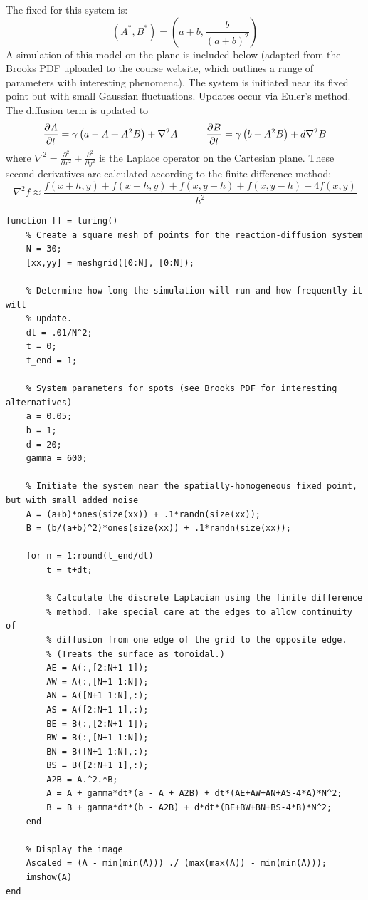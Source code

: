 \documentclass{article}
\begin{document}
The fixed for this system is:
\[ (A^*, B^*) = \left( a + b, \frac{b}{(a+b)^2} \right) \]
A simulation of this model on the plane is included below (adapted from the Brooks PDF uploaded to the course website, which outlines a range of parameters with interesting phenomena).  The system is initiated near its fixed point but with small Gaussian fluctuations. Updates occur via Euler's method. The diffusion term is updated to
\[ \frac{\partial A}{\partial t} = \gamma \left( a  - A + A^2 B \right) + \nabla^2 A \hspace{1 cm} \frac{\partial B}{\partial t} = \gamma \left( b -  A^2 B \right) + d \nabla^2 B\]
where $\nabla^2 = \frac{\partial^2}{\partial x^2} + \frac{\partial^2}{\partial y^2}$ is the Laplace operator on the Cartesian plane. These second derivatives are calculated according to the finite difference method:
\[ \nabla^2 f \approx \frac{f(x+h, y) + f(x-h,y) + f(x,y+h) + f(x,y-h) - 4 f(x,y)}{h^2} \]

\begin{lstlisting}
function [] = turing()
    % Create a square mesh of points for the reaction-diffusion system
    N = 30;
    [xx,yy] = meshgrid([0:N], [0:N]);
    
    % Determine how long the simulation will run and how frequently it will
    % update.
    dt = .01/N^2;
    t = 0;
    t_end = 1;
    
    % System parameters for spots (see Brooks PDF for interesting alternatives)
    a = 0.05;
    b = 1;
    d = 20;
    gamma = 600;
    
    % Initiate the system near the spatially-homogeneous fixed point, but with small added noise
    A = (a+b)*ones(size(xx)) + .1*randn(size(xx)); 
    B = (b/(a+b)^2)*ones(size(xx)) + .1*randn(size(xx));
    
    for n = 1:round(t_end/dt)
        t = t+dt;
        
        % Calculate the discrete Laplacian using the finite difference
        % method. Take special care at the edges to allow continuity of
        % diffusion from one edge of the grid to the opposite edge.
        % (Treats the surface as toroidal.)
        AE = A(:,[2:N+1 1]);
        AW = A(:,[N+1 1:N]);
        AN = A([N+1 1:N],:);
        AS = A([2:N+1 1],:);
        BE = B(:,[2:N+1 1]);
        BW = B(:,[N+1 1:N]);
        BN = B([N+1 1:N],:);
        BS = B([2:N+1 1],:);
        A2B = A.^2.*B;
        A = A + gamma*dt*(a - A + A2B) + dt*(AE+AW+AN+AS-4*A)*N^2;
        B = B + gamma*dt*(b - A2B) + d*dt*(BE+BW+BN+BS-4*B)*N^2;
    end
    
    % Display the image
    Ascaled = (A - min(min(A))) ./ (max(max(A)) - min(min(A)));
    imshow(A)
end
\end{lstlisting}
\end{document}
